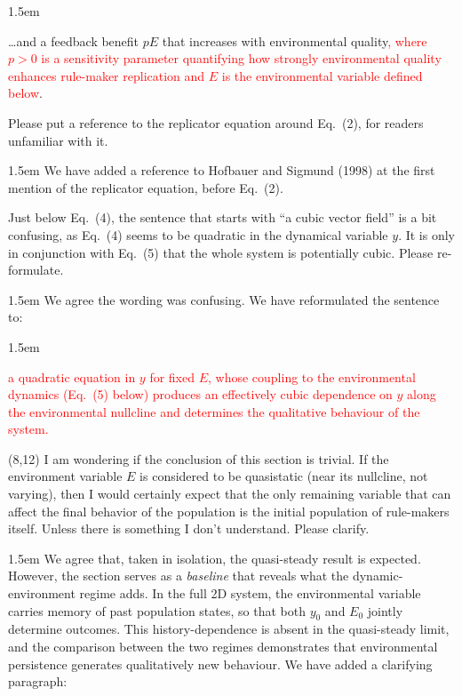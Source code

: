 \documentclass[11pt]{article}
\newcommand{\rev}[1]{\textcolor{red}{#1}}
\newcommand{\RC}[1]{\medskip\noindent #1\par}
\newenvironment{response}{\medskip\begin{adjustwidth}{1.5em}{}\color{blue}\mdseries\sloppy}{\end{adjustwidth}\color{black}}
\newenvironment{manuscript}{%
  \begin{adjustwidth}{1.5em}{}%
  \begin{mdframed}[
    topline=false, bottomline=false, rightline=false,
    linewidth=2pt, linecolor=red,
    innerleftmargin=1em, innerrightmargin=0pt,
    innertopmargin=0.4em, innerbottommargin=0.4em,
    skipabove=\medskipamount, skipbelow=\medskipamount
  ]\color{black}%
}{%
  \end{mdframed}%
  \end{adjustwidth}%
}
\begin{document}
\begin{manuscript}\ldots and a feedback benefit $pE$ that increases with environmental quality\rev{, where $p > 0$ is a sensitivity parameter quantifying how strongly environmental quality enhances rule-maker replication and $E$ is the environmental variable defined below}.
\end{manuscript}

\RC{Please put a reference to the replicator equation around Eq.~(2), for readers unfamiliar with it.}

\begin{response}
We have added a reference to Hofbauer and Sigmund (1998) at the first mention of the replicator equation, before Eq.~(2).
\end{response}

\RC{Just below Eq.~(4), the sentence that starts with ``a cubic vector field'' is a bit confusing, as Eq.~(4) seems to be quadratic in the dynamical variable $y$. It is only in conjunction with Eq.~(5) that the whole system is potentially cubic. Please re-formulate.}

\begin{response}
We agree the wording was confusing. We have reformulated the sentence to:
\end{response}

\begin{manuscript}\rev{a quadratic equation in $y$ for fixed $E$, whose coupling to the environmental dynamics (Eq.~(5) below) produces an effectively cubic dependence on $y$ along the environmental nullcline and determines the qualitative behaviour of the system.}
\end{manuscript}

\RC{(8,12) I am wondering if the conclusion of this section is trivial. If the environment variable $E$ is considered to be quasistatic (near its nullcline, not varying), then I would certainly expect that the only remaining variable that can affect the final behavior of the population is the initial population of rule-makers itself. Unless there is something I don't understand. Please clarify.}

\begin{response}
We agree that, taken in isolation, the quasi-steady result is expected. However, the section serves as a \emph{baseline} that reveals what the dynamic-environment regime adds. In the full 2D system, the environmental variable carries memory of past population states, so that both $y_0$ and $E_0$ jointly determine outcomes. This history-dependence is absent in the quasi-steady limit, and the comparison between the two regimes demonstrates that environmental persistence generates qualitatively new behaviour. We have added a clarifying paragraph:
\end{response}
\end{document}
